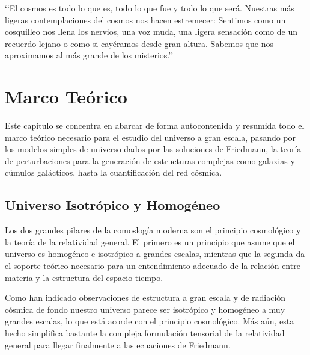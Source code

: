 \begin{savequote}[50mm]
‘‘El cosmos es todo lo que es, todo lo que fue y todo lo que será. Nuestras 
más ligeras contemplaciones del cosmos nos hacen estremecer: Sentimos como 
un cosquilleo nos llena los nervios, una voz muda, una ligera sensación como
de un recuerdo lejano o como si cayéramos desde gran altura. Sabemos que nos
aproximamos al más grande de los misterios.’’
\end{savequote}




\chapter{Marco Teórico}
\label{cha:Theoretical Framework}


Este capítulo se concentra en abarcar de forma autocontenida y resumida 
todo el marco teórico necesario para el estudio del universo a gran escala,
pasando por los modelos simples de universo dados por las soluciones de 
Friedmann, la teoría de perturbaciones para la generación de estructuras
complejas como galaxias y cúmulos galácticos, hasta la cuantificación del 
red cósmica.




\section{Universo Isotrópico y Homogéneo}
\label{sec:IsotropicAndHomogeneousUniverse}


Los dos grandes pilares de la comoslogía moderna son el principio cosmológico
y la teoría de la relatividad general. El primero es un principio que asume 
que el universo es homogéneo e isotrópico a grandes escalas, mientras que la 
segunda da el soporte teórico necesario para un entendimiento adecuado de la 
relación entre materia y la estructura del espacio-tiempo.


Como han indicado observaciones de estructura a gran escala y de radiación
cósmica de fondo nuestro universo parece ser isotrópico y homogéneo a muy
grandes escalas, lo que está acorde con el principio cosmológico. Más aún, 
esta hecho simplifica bastante la compleja formulación tensorial de la 
relatividad general para llegar finalmente a las ecuaciones de Friedmann.


